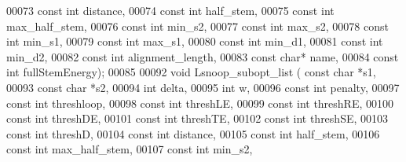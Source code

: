 \begin{DoxyCode}
00073                     \textcolor{keyword}{const} \textcolor{keywordtype}{int} distance,
00074                     \textcolor{keyword}{const} \textcolor{keywordtype}{int} half\_stem,
00075                     \textcolor{keyword}{const} \textcolor{keywordtype}{int} max\_half\_stem,
00076                     \textcolor{keyword}{const} \textcolor{keywordtype}{int} min\_s2,
00077                     \textcolor{keyword}{const} \textcolor{keywordtype}{int} max\_s2,
00078                     \textcolor{keyword}{const} \textcolor{keywordtype}{int} min\_s1,
00079                     \textcolor{keyword}{const} \textcolor{keywordtype}{int} max\_s1,
00080                     \textcolor{keyword}{const} \textcolor{keywordtype}{int} min\_d1,
00081                     \textcolor{keyword}{const} \textcolor{keywordtype}{int} min\_d2,
00082                     \textcolor{keyword}{const} \textcolor{keywordtype}{int} alignment\_length,
00083                     \textcolor{keyword}{const} \textcolor{keywordtype}{char}* name,
00084         \textcolor{keyword}{const} \textcolor{keywordtype}{int} fullStemEnergy);
00085 
00092 \textcolor{keywordtype}{void} Lsnoop\_subopt\_list ( \textcolor{keyword}{const} \textcolor{keywordtype}{char} *s1,
00093                           \textcolor{keyword}{const} \textcolor{keywordtype}{char} *s2,
00094                           \textcolor{keywordtype}{int} delta,
00095                           \textcolor{keywordtype}{int} w, 
00096                           \textcolor{keyword}{const} \textcolor{keywordtype}{int} penalty,
00097                           \textcolor{keyword}{const} \textcolor{keywordtype}{int} threshloop, 
00098                           \textcolor{keyword}{const} \textcolor{keywordtype}{int} threshLE,
00099                           \textcolor{keyword}{const} \textcolor{keywordtype}{int} threshRE,
00100                           \textcolor{keyword}{const} \textcolor{keywordtype}{int} threshDE,
00101                           \textcolor{keyword}{const} \textcolor{keywordtype}{int} threshTE,
00102                           \textcolor{keyword}{const} \textcolor{keywordtype}{int} threshSE,
00103                           \textcolor{keyword}{const} \textcolor{keywordtype}{int} threshD,
00104                           \textcolor{keyword}{const} \textcolor{keywordtype}{int} distance,
00105                           \textcolor{keyword}{const} \textcolor{keywordtype}{int} half\_stem,
00106                           \textcolor{keyword}{const} \textcolor{keywordtype}{int} max\_half\_stem,
00107                           \textcolor{keyword}{const} \textcolor{keywordtype}{int} min\_s2,

\end{DoxyCode}
